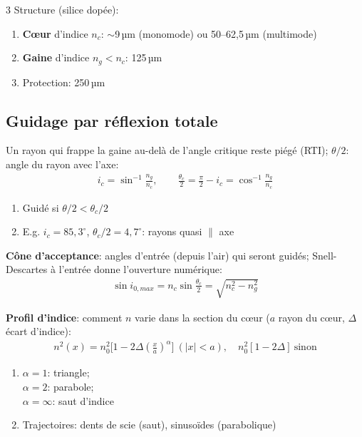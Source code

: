 \documentclass[12pt, a4paper]{article}
\begin{document}
\begin{multicols*}{3}
	Structure (silice dopée):
	\begin{enumerate}[\roman*.]
		\item \textbf{Cœur} d'indice $n_c$: $\sim$9\,µm (monomode) ou 50--62,5\,µm (multimode)
		\item \textbf{Gaine} d'indice $n_g<n_c$: 125\,µm
		\item Protection: 250\,µm
	\end{enumerate}

	\subsection{Guidage par réflexion totale}
	Un rayon qui frappe la gaine au-delà de l'angle critique reste piégé (RTI); $\theta/2$: angle du rayon avec l'axe:
	\begin{gather*}
		i_c=\sin^{-1}\frac{n_g}{n_c},\qquad\frac{\theta_c}{2}=\frac\pi2-i_c=\cos^{-1}\frac{n_g}{n_c}
	\end{gather*}
	\begin{enumerate}[\roman*.]
		\item Guidé si $\theta/2<\theta_c/2$
		\item E.g. $i_c=85{,}3^\circ$, $\theta_c/2=4{,}7^\circ$: rayons quasi $\parallel$ axe
	\end{enumerate}
	\textbf{Cône d'acceptance}: angles d'entrée (depuis l'air) qui seront guidés; Snell-Descartes à l'entrée donne l'ouverture numérique:
	\begin{gather*}
		\sin i_{0,max}=n_c\sin\frac{\theta_c}{2}=\sqrt{n_c^2-n_g^2}
	\end{gather*}

	\textbf{Profil d'indice}: comment $n$ varie dans la section du cœur ($a$ rayon du cœur, $\Delta$ écart d'indice):
	\begin{gather*}
		n^2(x)=n_0^2\big[1-2\Delta(\tfrac xa)^\alpha\big]\ (|x|<a),\quad n_0^2[1-2\Delta]\ \text{sinon}
	\end{gather*}
	\begin{enumerate}[\roman*.]
		\item $\alpha=1$: triangle;\\$\alpha=2$: parabole;\\$\alpha=\infty$: saut d'indice
		\item Trajectoires: dents de scie (saut), sinusoïdes (parabolique)
	\end{enumerate}

	\colbreak

\end{multicols*}
\end{document}
